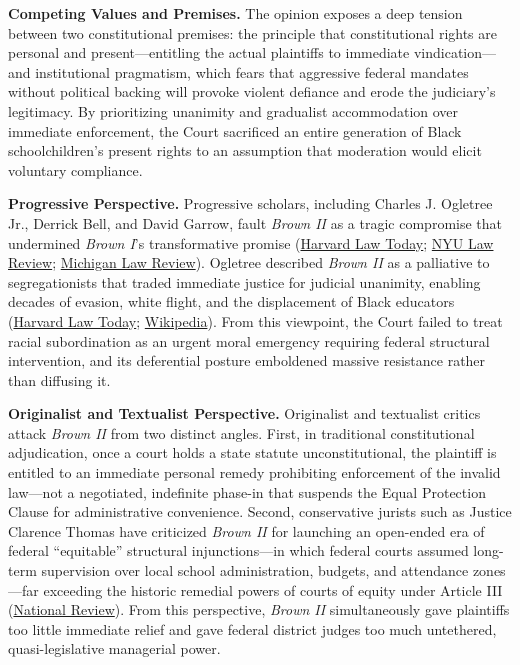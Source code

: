 \documentclass[12pt]{article}
\begin{document}
\textbf{Competing Values and Premises.} The opinion exposes a deep tension between two constitutional premises: the principle that constitutional rights are personal and present---entitling the actual plaintiffs to immediate vindication---and institutional pragmatism, which fears that aggressive federal mandates without political backing will provoke violent defiance and erode the judiciary's legitimacy. By prioritizing unanimity and gradualist accommodation over immediate enforcement, the Court sacrificed an entire generation of Black schoolchildren's present rights to an assumption that moderation would elicit voluntary compliance.

\textbf{Progressive Perspective.} Progressive scholars, including Charles J. Ogletree Jr., Derrick Bell, and David Garrow, fault \textit{Brown II} as a tragic compromise that undermined \textit{Brown I}'s transformative promise (\href{https://hls.harvard.edu/today/q-a-professor-ogletree-on-the-brown-v-board-decision/}{Harvard Law Today}; \href{https://nyulawreview.org/wp-content/uploads/2018/08/NYULawReview-80-2-Perez.pdf}{NYU Law Review}; \href{https://repository.law.umich.edu/mlr/vol103/iss6/12/}{Michigan Law Review}). Ogletree described \textit{Brown II} as a palliative to segregationists that traded immediate justice for judicial unanimity, enabling decades of evasion, white flight, and the displacement of Black educators (\href{https://hls.harvard.edu/today/q-a-professor-ogletree-on-the-brown-v-board-decision/}{Harvard Law Today}; \href{https://en.wikipedia.org/wiki/Brown_v._Board_of_Education}{Wikipedia}). From this viewpoint, the Court failed to treat racial subordination as an urgent moral emergency requiring federal structural intervention, and its deferential posture emboldened massive resistance rather than diffusing it.

\textbf{Originalist and Textualist Perspective.} Originalist and textualist critics attack \textit{Brown II} from two distinct angles. First, in traditional constitutional adjudication, once a court holds a state statute unconstitutional, the plaintiff is entitled to an immediate personal remedy prohibiting enforcement of the invalid law---not a negotiated, indefinite phase-in that suspends the Equal Protection Clause for administrative convenience. Second, conservative jurists such as Justice Clarence Thomas have criticized \textit{Brown II} for launching an open-ended era of federal ``equitable'' structural injunctions---in which federal courts assumed long-term supervision over local school administration, budgets, and attendance zones---far exceeding the historic remedial powers of courts of equity under Article III (\href{https://www.nationalreview.com/bench-memos/misrepresenting-justice-thomas-on-brown}{National Review}). From this perspective, \textit{Brown II} simultaneously gave plaintiffs too little immediate relief and gave federal district judges too much untethered, quasi-legislative managerial power.
\end{document}
